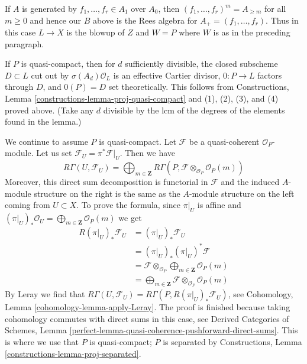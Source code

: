\medskip\noindent
If $A$ is generated by $f_1, \ldots, f_r \in A_1$ over $A_0$, then
$(f_1, \ldots, f_r)^m = A_{\geq m}$ for all $m \geq 0$ and hence our
$B$ above is the Rees algebra for $A_+ = (f_1, \ldots, f_r)$. Thus in this
case $L \to X$ is the blowup of $Z$ and $W = P$ where $W$ is as in
the preceding paragraph.

\medskip\noindent
If $P$ is quasi-compact, then for $d$ sufficiently divisible, the
closed subscheme $D \subset L$ cut out by $\sigma(A_d)\mathcal{O}_L$
is an effective Cartier divisor, $0 : P \to L$ factors through $D$,
and $0(P) = D$ set theoretically. This follows from
Constructions, Lemma \ref{constructions-lemma-proj-quasi-compact}
and (1), (2), (3), and (4) proved above. (Take any $d$ divisible by the
lcm of the degrees of the elements found in the lemma.)

\medskip\noindent
We continue to assume $P$ is quasi-compact.
Let $\mathcal{F}$ be a quasi-coherent $\mathcal{O}_P$-module.
Let us set $\mathcal{F}_U = \pi^*\mathcal{F}|_U$. Then we have
\begin{equation}
\label{equation-cohomology-torsor}
R\Gamma(U, \mathcal{F}_U) =
\bigoplus\nolimits_{m \in \mathbf{Z}}
R\Gamma(P, \mathcal{F} \otimes_{\mathcal{O}_P} \mathcal{O}_P(m))
\end{equation}
Moreover, this direct sum decomposition is functorial in $\mathcal{F}$
and the induced $A$-module structure on the right is the same as the
$A$-module structure on the left coming from $U \subset X$.
To prove the formula, since $\pi|_U$ is affine and
$(\pi|_U)_*\mathcal{O}_U = \bigoplus_{m \in \mathbf{Z}} \mathcal{O}_P(m)$
we get
\begin{align*}
R(\pi|_U)_*\mathcal{F}_U
& =
(\pi|_U)_*\mathcal{F}_U \\
& =
(\pi|_U)_*(\pi|_U)^*\mathcal{F} \\
& =
\mathcal{F} \otimes_{\mathcal{O}_P} 
\bigoplus\nolimits_{m \in \mathbf{Z}} \mathcal{O}_P(m) \\
& =
\bigoplus\nolimits_{m \in \mathbf{Z}}
\mathcal{F} \otimes_{\mathcal{O}_P} \mathcal{O}_P(m)
\end{align*}
By Leray we find that
$R\Gamma(U, \mathcal{F}_U) =
R\Gamma(P, R(\pi|_U)_*\mathcal{F}_U)$, see
Cohomology, Lemma \ref{cohomology-lemma-apply-Leray}.
The proof is finished because taking cohomology commutes with
direct sums in this case, see Derived Categories of Schemes, Lemma
\ref{perfect-lemma-quasi-coherence-pushforward-direct-sums}.
This is where we use that $P$ is quasi-compact; $P$ is separated
by Constructions, Lemma \ref{constructions-lemma-proj-separated}.

